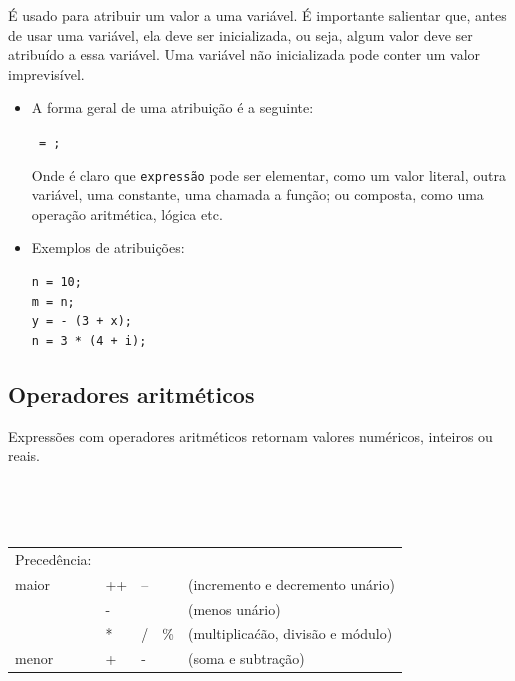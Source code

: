 É usado para atribuir um valor a uma variável. É importante salientar que, antes de usar uma variável, ela deve ser inicializada, ou seja, algum valor deve ser atribuído a essa variável. Uma variável não inicializada pode conter um valor imprevisível.

\begin{itemize}
\item A forma geral de uma atribuição é a seguinte:

{\tt {} = ;}

Onde é claro que {\tt expressão} pode ser elementar, como um valor literal, outra variável, uma constante, uma chamada a função; ou composta, como uma operação aritmética, lógica etc.

\item Exemplos de atribuições:
\begin{lstlisting}
n = 10;
m = n;
y = - (3 + x);
n = 3 * (4 + i);
\end{lstlisting}

\end{itemize}

\subsection{Operadores aritméticos}

Expressões com operadores aritméticos retornam valores numéricos, inteiros ou reais.

~\\

{\tt
\begin{tabular}{|l|llll|}
\hline
Precedência:        &    &    &     &                                    \\
maior               & ++ & -- &     & (incremento e decremento unário)   \\
                    & -  &    &     & (menos unário)                     \\
                    & *  & /  & \%  & (multiplicaćão, divisão e módulo)  \\
menor               & +  & -  &     & (soma e subtração)                 \\
\hline
\end{tabular}
}

